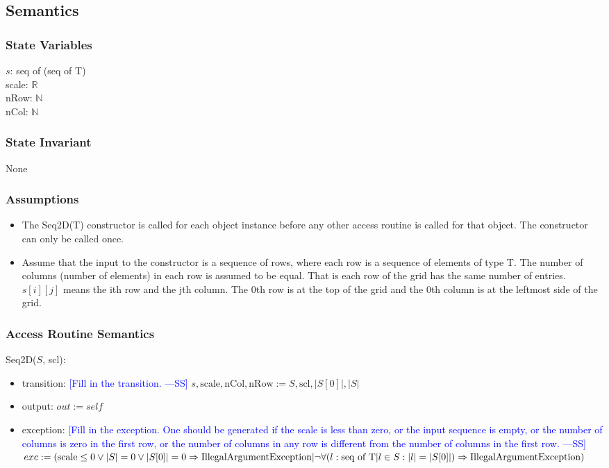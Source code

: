 \documentclass[12pt]{article}
\newcommand{\authornote}[3]{\textcolor{#1}{[#3 ---#2]}}
\newcommand{\authornote}[3]{}
\newcommand{\wss}[1]{\authornote{blue}{SS}{#1}}
\begin{document}
\subsection* {Semantics}

\subsubsection* {State Variables}

$s$: seq of (seq of T)\\
scale: $\mathbb{R}$\\
nRow: $\mathbb{N}$\\
nCol: $\mathbb{N}$

\subsubsection* {State Invariant}

None

\subsubsection* {Assumptions}

\begin{itemize}
\item The Seq2D(T) constructor is called for each object instance before any
other access routine is called for that object.  The constructor can only be
called once.
\item Assume that the input to the constructor is a sequence of rows, where each
  row is a sequence of elements of type T.  The number of columns (number of
  elements) in each row is assumed to be equal. That is each row
  of the grid has the same number of entries.  $s[i][j]$ means the ith row and
  the jth column.  The 0th row is at the top of the grid and the 0th column
  is at the leftmost side of the grid.
\end{itemize}

\subsubsection* {Access Routine Semantics}

Seq2D($S$, scl):
\begin{itemize}
\item transition: \wss{Fill in the transition.}  $s, \mbox{scale}, \mbox{nCol}, \mbox{nRow} := S,
  \mbox{scl}, |S[0]|, |S|$
\item output: $\mathit{out} := \mathit{self}$
\item exception: \wss{Fill in the exception.  One should be generated if the
    scale is less than zero, or the input sequence is empty, or the number of
    columns is zero in the first row, or the number of columns in any row is
    different from the number of columns in the first row.} $exc := (\mbox{scale} \leq 0 \lor |S| = 0 \lor |S[0]| = 0 \Rightarrow \mbox{IllegalArgumentException}|\\
  \lnot\forall(l : \mbox{seq of T}|l \in S : |l| = |S[0]|) \Rightarrow
  \mbox{IllegalArgumentException})$
\end{itemize}
\end{document}
